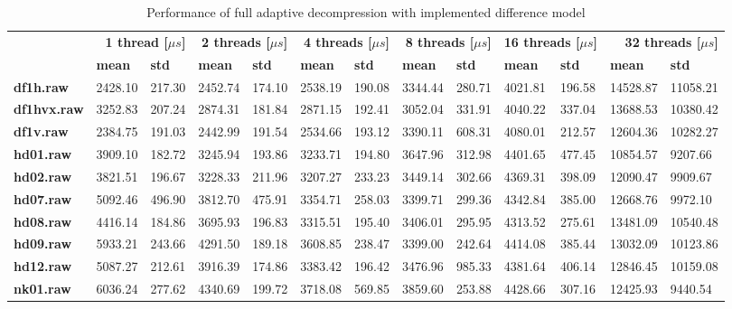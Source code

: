 \begin{table}
\centering
\small
\begin{tabular}{l|ll|ll|ll|ll|ll|ll}
    & \multicolumn{2}{r|}{\textbf{1 thread [$\mu s$]}} & \multicolumn{2}{r|}{\textbf{2 threads [$\mu s$]}} & \multicolumn{2}{r|}{\textbf{4 threads [$\mu s$]}} & \multicolumn{2}{r|}{\textbf{8 threads [$\mu s$]}} & \multicolumn{2}{r|}{\textbf{16 threads [$\mu s$]}} & \multicolumn{2}{r}{\textbf{32 threads [$\mu s$]}} \\
    & \textbf{mean} & \textbf{std} & \textbf{mean} & \textbf{std} & \textbf{mean} & \textbf{std} & \textbf{mean} & \textbf{std} & \textbf{mean} & \textbf{std} & \textbf{mean} & \textbf{std} \\
\hline
    \textbf{df1h.raw} & 2428.10 & 217.30 & 2452.74 & 174.10 & 2538.19 & 190.08 & 3344.44 & 280.71 & 4021.81 & 196.58 & 14528.87 & 11058.21 \\
    \textbf{df1hvx.raw} & 3252.83 & 207.24 & 2874.31 & 181.84 & 2871.15 & 192.41 & 3052.04 & 331.91 & 4040.22 & 337.04 & 13688.53 & 10380.42 \\
    \textbf{df1v.raw} & 2384.75 & 191.03 & 2442.99 & 191.54 & 2534.66 & 193.12 & 3390.11 & 608.31 & 4080.01 & 212.57 & 12604.36 & 10282.27 \\
    \textbf{hd01.raw} & 3909.10 & 182.72 & 3245.94 & 193.86 & 3233.71 & 194.80 & 3647.96 & 312.98 & 4401.65 & 477.45 & 10854.57 & 9207.66 \\
    \textbf{hd02.raw} & 3821.51 & 196.67 & 3228.33 & 211.96 & 3207.27 & 233.23 & 3449.14 & 302.66 & 4369.31 & 398.09 & 12090.47 & 9909.67 \\
    \textbf{hd07.raw} & 5092.46 & 496.90 & 3812.70 & 475.91 & 3354.71 & 258.03 & 3399.71 & 299.36 & 4342.84 & 385.00 & 12668.76 & 9972.10 \\
    \textbf{hd08.raw} & 4416.14 & 184.86 & 3695.93 & 196.83 & 3315.51 & 195.40 & 3406.01 & 295.95 & 4313.52 & 275.61 & 13481.09 & 10540.48 \\
    \textbf{hd09.raw} & 5933.21 & 243.66 & 4291.50 & 189.18 & 3608.85 & 238.47 & 3399.00 & 242.64 & 4414.08 & 385.44 & 13032.09 & 10123.86 \\
    \textbf{hd12.raw} & 5087.27 & 212.61 & 3916.39 & 174.86 & 3383.42 & 196.42 & 3476.96 & 985.33 & 4381.64 & 406.14 & 12846.45 & 10159.08 \\
    \textbf{nk01.raw} & 6036.24 & 277.62 & 4340.69 & 199.72 & 3718.08 & 569.85 & 3859.60 & 253.88 & 4428.66 & 307.16 & 12425.93 & 9440.54 \\
\end{tabular}
\caption{Performance of full adaptive decompression with implemented difference model}
\end{table}
